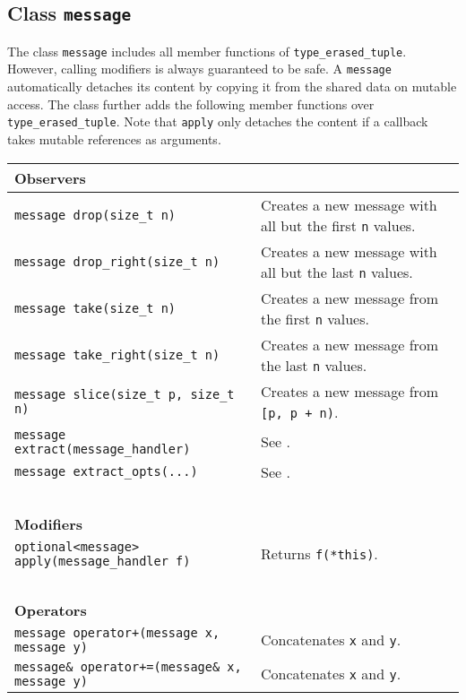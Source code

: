 \subsection{Class \lstinline^message^}

The class \lstinline^message^ includes all member functions of
\lstinline^type_erased_tuple^. However, calling modifiers is always guaranteed
to be safe. A \lstinline^message^ automatically detaches its content by copying
it from the shared data on mutable access. The class further adds the following
member functions over \lstinline^type_erased_tuple^. Note that
\lstinline^apply^ only detaches the content if a callback takes mutable
references as arguments.

\begin{center}
\begin{tabular}{ll}
  \textbf{Observers} & ~ \\
  \hline
  \lstinline^message drop(size_t n)^ & Creates a new message with all but the first \lstinline^n^ values. \\
  \hline
  \lstinline^message drop_right(size_t n)^ & Creates a new message with all but the last \lstinline^n^ values. \\
  \hline
  \lstinline^message take(size_t n)^ & Creates a new message from the first \lstinline^n^ values. \\
  \hline
  \lstinline^message take_right(size_t n)^ & Creates a new message from the last \lstinline^n^ values. \\
  \hline
  \lstinline^message slice(size_t p, size_t n)^ & Creates a new message from \lstinline^[p, p + n)^. \\
  \hline
  \lstinline^message extract(message_handler)^ & See . \\
  \hline
  \lstinline^message extract_opts(...)^ & See . \\
  \hline
  ~ & ~ \\ \textbf{Modifiers} & ~ \\
  \hline
  \lstinline^optional<message> apply(message_handler f)^ & Returns \lstinline^f(*this)^. \\
  \hline
  ~ & ~ \\ \textbf{Operators} & ~ \\
  \hline
  \lstinline^message operator+(message x, message y)^ & Concatenates \lstinline^x^ and \lstinline^y^. \\
  \hline
  \lstinline^message& operator+=(message& x, message y)^ & Concatenates \lstinline^x^ and \lstinline^y^. \\
  \hline
\end{tabular}
\end{center}

